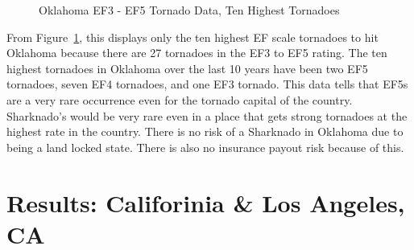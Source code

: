 \documentclass[
  letterpaper,
  DIV=11,
  numbers=noendperiod]{scrreprt}
\begin{document}
\begin{figure}


\caption{\label{fig-table4}Oklahoma EF3 - EF5 Tornado Data, Ten Highest
Tornadoes}

\end{figure}%

From Figure~\ref{fig-table4}, this displays only the ten highest EF
scale tornadoes to hit Oklahoma because there are 27 tornadoes in the
EF3 to EF5 rating. The ten highest tornadoes in Oklahoma over the last
10 years have been two EF5 tornadoes, seven EF4 tornadoes, and one EF3
tornado. This data tells that EF5s are a very rare occurrence even for
the tornado capital of the country. Sharknado's would be very rare even
in a place that gets strong tornadoes at the highest rate in the
country. There is no risk of a Sharknado in Oklahoma due to being a land
locked state. There is also no insurance payout risk because of this.

\section{Results: Califorinia \& Los Angeles,
CA}\label{results-califorinia-los-angeles-ca}
\end{document}
